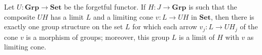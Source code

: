 Let $U : \mathbf{Grp} \rightarrow \mathbf{Set}$ be the forgetful functor. If $H : J \rightarrow \mathbf{Grp}$ is such that the composite $UH$ has a limit $L$ and a limiting cone $v : L \rightarrow UH$ in $\mathbf{Set}$, then there is exactly one group structure on the set $L$ for which each arrow $v_j : L \rightarrow UH_j$ of the cone $v$ is a morphism of groups; moreover, this group $L$ is a limit of $H$ with $v$ as limiting cone.
